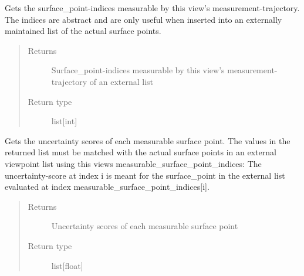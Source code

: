 \documentclass[letterpaper,10pt,english]{sphinxmanual}
\begin{document}
\begin{fulllineitems}
\begin{fulllineitems}
\end{fulllineitems}


\begin{fulllineitems}
\label{\detokenize{module_view:agiprobot_measurement.view.View.get_measurable_surface_point_indices}}
Gets the surface\_point-indices measurable by this view’s measurement-trajectory. The indices are abstract and are only useful 
when inserted into an externally maintained list of the actual surface points.
\begin{quote}\begin{description}
\item[{Returns}] \leavevmode
Surface\_point-indices measurable by this view’s measurement-trajectory of an external list

\item[{Return type}] \leavevmode
list{[}int{]}

\end{description}\end{quote}

\end{fulllineitems}


\begin{fulllineitems}
\label{\detokenize{module_view:agiprobot_measurement.view.View.get_measurable_surface_point_scores}}
Gets the uncertainty scores of each measurable surface point. The values in the returned list must be matched with the
actual surface points in an external viewpoint list using this views measurable\_surface\_point\_indices: The uncertainty-score at index i
is meant for the surface\_point in the external list evaluated at index measurable\_surface\_point\_indices{[}i{]}.
\begin{quote}\begin{description}
\item[{Returns}] \leavevmode
Uncertainty scores of each measurable surface point

\item[{Return type}] \leavevmode
list{[}float{]}

\end{description}\end{quote}


\end{fulllineitems}
\end{fulllineitems}
\end{document}
